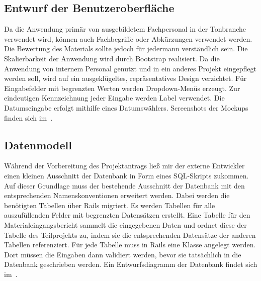 \subsection{Entwurf der Benutzeroberfläche}
\label{sec:Benutzungsoberfläche}
Da die Anwendung primär von ausgebildetem Fachpersonal in der Tonbranche verwendet wird, können auch Fachbegriffe oder Abkürzungen verwendet werden. Die Bewertung des Materials sollte jedoch für jedermann verständlich sein. Die Skalierbarkeit der Anwendung wird durch \acs{Bootstrap} realisiert. Da die Anwendung von internem Personal genutzt und in ein anderes Projekt eingepflegt werden soll, wird auf ein ausgeklügeltes, repräsentatives Design verzichtet. Für Eingabefelder mit begrenzten Werten werden Dropdown-Menüs erzeugt. Zur eindeutigen Kennzeichnung jeder Eingabe werden Label verwendet. Die Datumseingabe erfolgt mithilfe eines Datumswählers. Screenshots der Mockups finden sich im~.


\subsection{Datenmodell}
\label{sec:Datenmodell}
Während der Vorbereitung des Projektantrags ließ mir der externe Entwickler einen kleinen Ausschnitt der Datenbank in Form eines \acs{SQL}-Skripts zukommen. Auf dieser Grundlage muss der bestehende Ausschnitt der Datenbank mit den entsprechenden Namenskonventionen erweitert werden. Dabei werden die benötigten Tabellen über Rails migriert. Es werden Tabellen für alle auszufüllenden Felder mit begrenzten Datensätzen erstellt. Eine Tabelle für den Materialeingangsbericht sammelt die eingegebenen Daten und ordnet diese der Tabelle des Teilprojekts zu, indem sie die entsprechenden Datensätze der anderen Tabellen referenziert. Für jede Tabelle muss in Rails eine Klasse angelegt werden. Dort müssen die Eingaben dann validiert werden, bevor sie tatsächlich in die Datenbank geschrieben werden. Ein Entwurfsdiagramm der Datenbank findet sich im~.

